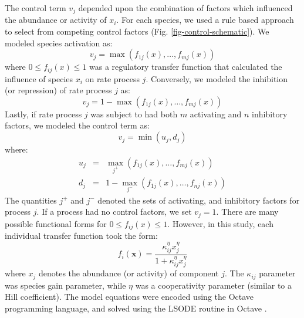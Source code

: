 \documentclass[12pt]{article}
\begin{document}
The control term $v_{j}$ depended upon the combination of factors which influenced the abundance or activity of $x_{i}$.
For each species, we used a rule based approach to select from competing control factors (Fig. \ref{fig-control-schematic}). 
We modeled species activation as:
\begin{equation}
	v_{j} = \max\left(f_{1j}\left(x\right),\hdots,f_{mj}\left(x\right)\right)
\end{equation}where $0\leq f_{ij}\left(x\right)\leq 1$ was a regulatory transfer function that calculated the influence of species $x_{i}$ on rate process $j$. 
Conversely, we modeled the inhibition (or repression) of rate process $j$ as:
\begin{equation}
	v_{j} = 1 - \max\left(f_{1j}\left(x\right),\hdots,f_{mj}\left(x\right)\right)
\end{equation}Lastly, if rate process $j$ was subject to had both $m$ activating and $n$ inhibitory factors, we modeled the control term as:
\begin{equation}
	v_{j} = \min\left(u_{j},d_{j}\right)
\end{equation}where:
\begin{eqnarray}
	u_{j} &=& \max_{j^{+}}\left(f_{1j}\left(x\right),\hdots,f_{mj}\left(x\right)\right) \\
	d_{j} &=& 1 - \max_{j^{-}}\left(f_{1j}\left(x\right),\hdots,f_{nj}\left(x\right)\right)
\end{eqnarray}The quantities $j^{+}$ and $j^{-}$ denoted the sets of activating, and inhibitory factors for process $j$. 
If a process had no control factors, we set $v_{j} = 1$.
There are many possible functional forms for $0\leq f_{ij}\left(x\right)\leq 1$. 
However, in this study, each individual transfer function took the form:
\begin{equation}\label{eqn:control-factor}
	f_{i}\left(\mathbf{x}\right) = \frac{\kappa_{ij}^{\eta}x_{j}^{\eta}}{1 + \kappa_{ij}^{\eta}x_{j}^{\eta}}
\end{equation}where $x_{j}$ denotes the abundance (or activity) of component $j$.  
The $\kappa_{ij}$ parameter was species gain parameter, while $\eta$ was a cooperativity parameter (similar to a Hill coefficient).
The model equations were encoded using the Octave programming language, and solved using the LSODE routine in Octave \citep{Octave:2014}.
\end{document}
